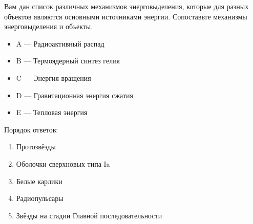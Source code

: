 Вам дан список различных механизмов энерговыделения, которые для
разных объектов являются основными источниками энергии. Сопоставьте механизмы
энерговыделения и объекты.

\begin{itemize}
  \item A — Радиоактивный распад
  \item B — Термоядерный синтез гелия
  \item C — Энергия вращения
  \item D — Гравитационная энергия сжатия
  \item E — Тепловая энергия
\end{itemize}

Порядок ответов:
\begin{enumerate}[label=\arabic*)]
  \item Протозвёзды
  \item Оболочки сверхновых типа Ia
  \item Белые карлики
  \item Радиопульсары
  \item Звёзды на стадии Главной последовательности
\end{enumerate}
